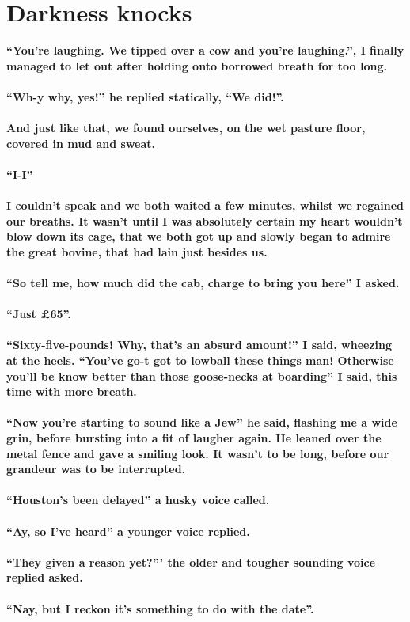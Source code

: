 \documentclass{book}
\begin{document}
\chapter{Darkness knocks}
\endgroup
\LARGE{
\textbf{
``You're laughing. We tipped over a cow and you're
laughing.'', I finally managed to let out after holding
onto borrowed breath for too long.\\\\
``Wh-y why, yes!'' he replied statically, ``We did!''.\\\\
And just like that, we found ourselves, on
the wet pasture floor, covered in mud and sweat.\\\\
``I-I''\\\\
I couldn't speak and we both waited a few minutes,
whilst we regained our breaths.
It wasn't until I was absolutely certain my heart wouldn't blow down its cage,
that we both got up and slowly began to admire
the great bovine, that had lain just besides us.\\\\
``So tell me, how much did the cab, charge to bring you here'' I asked.\\\\
``Just £65''.\\\\
``Sixty-five-pounds! Why, that's an absurd amount!'' I said, wheezing at the heels. ``You've go-t got to lowball these
things man! Otherwise you'll be know better than those goose-necks at boarding'' I said, this time with more breath.\\\\
``Now you're starting to sound like a Jew'' he said, flashing me a wide grin, before bursting
into a fit of laugher again.
He leaned over the metal fence and gave a smiling look.
It wasn't to be long, before our grandeur was to be interrupted.\\\\
``Houston's been delayed'' a husky voice called.\\\\
``Ay, so I've heard'' a younger voice replied.\\\\
``They given a reason yet?''' the older and tougher sounding voice replied asked.\\\\
``Nay, but I reckon it's something to do with the date''.\\\\
}}
\end{document}

